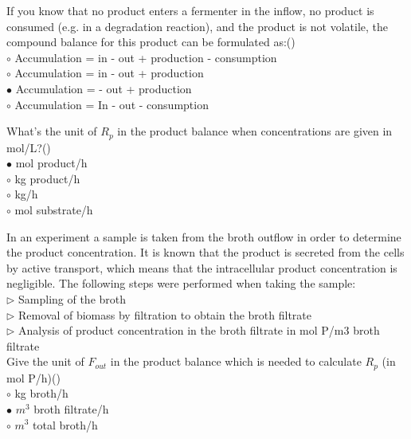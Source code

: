 \documentclass[]{beamer}
\begin{document}
\begin{frame}[shrink] {}
\addtocounter{answers}{1}
\color{blue}
If you know that no product enters a fermenter in the inflow, no product is consumed (e.g. in a degradation reaction), and the product is not volatile, the compound balance for this product can be formulated as:()\\
\color{black}
\setlength{\parindent}{-0.4cm}
{\color{red}$\circ$}  Accumulation = in - out + production - consumption\\
{\color{red}$\circ$} Accumulation = in - out + production \\
{\color{red}$\bullet$} Accumulation = - out + production \\
{\color{red}$\circ$} Accumulation = In - out - consumption
\end{frame}

\begin{frame}[shrink] {}
\addtocounter{answers}{1}
\color{blue}
What’s the unit of $R_p$ in the product balance when concentrations are given in mol/L?()\\
\color{black}
\setlength{\parindent}{-0.4cm}
{\color{red}$\bullet$} mol product/h \\
{\color{red}$\circ$} kg product/h\\
{\color{red}$\circ$} kg/h\\
{\color{red}$\circ$} mol substrate/h\\
\end{frame}

\begin{frame}[shrink] {}
\addtocounter{answers}{1}
\color{blue}
In an experiment a sample is taken from the broth outflow in order to determine the product concentration. It is known that the product is secreted from the cells by active transport, which means that the intracellular product concentration is negligible. The following steps were performed when taking the sample:\\
{\color{red}$\triangleright$} Sampling of the broth\\
{\color{red}$\triangleright$} Removal of biomass by filtration to obtain the broth filtrate\\
{\color{red}$\triangleright$} Analysis of product concentration in the broth filtrate in mol P/m3 broth filtrate\\[0.5em]

  Give the unit of $F_{out}$ in the product balance which is needed to calculate $R_p$ (in mol P/h)()\\
\color{black}
\setlength{\parindent}{-0.4cm}
{\color{red}$\circ$}  kg broth/h\\
{\color{red}$\bullet$} $m^3$ broth filtrate/h \\
{\color{red}$\circ$} $m^3$ total broth/h \\
\end{frame}
\end{document}
